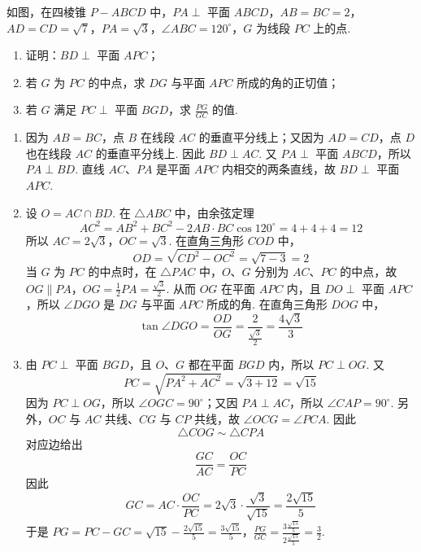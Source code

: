 \begin{problem}
如图，在四棱锥 \(P - ABCD\) 中，\(PA \perp\) 平面 \(ABCD\)，\(AB = BC = 2\)，\(AD = CD = \sqrt{7}\)，\(PA = \sqrt{3}\)，\(\angle ABC = 120^\circ\)，\(G\) 为线段 \(PC\) 上的点.
\begin{enumerate}
\item 证明：\(BD \perp\) 平面 \(APC\)；
\item 若 \(G\) 为 \(PC\) 的中点，求 \(DG\) 与平面 \(APC\) 所成的角的正切值；
\item 若 \(G\) 满足 \(PC \perp \) 平面 \(BGD\)，求 \(\frac{PG}{GC}\) 的值.
\end{enumerate}

\end{problem}

\begin{solution}
\begin{enumerate}
\item 因为 \(AB=BC\)，点 \(B\) 在线段 \(AC\) 的垂直平分线上；又因为 \(AD=CD\)，点 \(D\) 也在线段 \(AC\) 的垂直平分线上. 因此 \(BD\perp AC\). 又 \(PA\perp\) 平面 \(ABCD\)，所以 \(PA\perp BD\). 直线 \(AC\)、\(PA\) 是平面 \(APC\) 内相交的两条直线，故 \(BD\perp\) 平面 \(APC\).

\item 设 \(O=AC\cap BD\). 在 \(\triangle ABC\) 中，由余弦定理
\[
AC^2=AB^2+BC^2-2AB\cdot BC\cos120^\circ=4+4+4=12
\]
所以 \(AC=2\sqrt3\)，\(OC=\sqrt3\). 在直角三角形 \(COD\) 中，
\[
OD=\sqrt{CD^2-OC^2}=\sqrt{7-3}=2
\]
当 \(G\) 为 \(PC\) 的中点时，在 \(\triangle PAC\) 中，\(O\)、\(G\) 分别为 \(AC\)、\(PC\) 的中点，故
\(OG\parallel PA\)，\(OG=\frac12PA=\frac{\sqrt3}{2}\).
从而 \(OG\) 在平面 \(APC\) 内，且 \(DO\perp\) 平面 \(APC\)，所以 \(\angle DGO\) 是 \(DG\) 与平面 \(APC\) 所成的角. 在直角三角形 \(DOG\) 中，
\[
\tan\angle DGO=\frac{OD}{OG}=\frac{2}{\frac{\sqrt3}{2}}=\frac{4\sqrt3}{3}
\]

\item 由 \(PC\perp\) 平面 \(BGD\)，且 \(O\)、\(G\) 都在平面 \(BGD\) 内，所以 \(PC\perp OG\). 又
\[
PC=\sqrt{PA^2+AC^2}=\sqrt{3+12}=\sqrt{15}
\]
因为 \(PC\perp OG\)，所以 \(\angle OGC=90^\circ\)；又因 \(PA\perp AC\)，所以 \(\angle CAP=90^\circ\). 另外，\(OC\) 与 \(AC\) 共线、\(CG\) 与 \(CP\) 共线，故 \(\angle OCG=\angle PCA\). 因此
\[
\triangle COG\sim\triangle CPA
\]
对应边给出
\[
\frac{GC}{AC}=\frac{OC}{PC}
\]
因此
\[
GC=AC\cdot\frac{OC}{PC}=2\sqrt3\cdot\frac{\sqrt3}{\sqrt{15}}=\frac{2\sqrt{15}}{5}
\]
于是
\(PG=PC-GC=\sqrt{15}-\frac{2\sqrt{15}}{5}=\frac{3\sqrt{15}}{5}\)，\(\frac{PG}{GC}=\frac{3\frac{\sqrt{15}}{5}}{2\frac{\sqrt{15}}{5}}=\frac32\).
\end{enumerate}
\end{solution}

